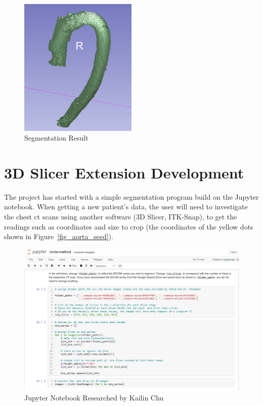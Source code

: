 \begin{figure}[H]
    \centering
    \includegraphics[width=0.5\textwidth]{figures/AGR/segmentation_result.png}
    \caption[Segmentation Result]{Segmentation Result}
    \label{fig_sr}
\end{figure}

\section{3D Slicer Extension Development}
The project has started with a simple segmentation program build on the Jupyter notebook. When getting a new patient's data, the user will need to investigate the chest ct scans using another software (3D Slicer, ITK-Snap), to get the readings such as coordinates and size to crop (the coordinates of the yellow dots shown in Figure~\ref{fig_aorta_seed}).

\begin{figure}[H]
    \centering
    \includegraphics[width=\textwidth]{figures/AGR/jupyter_research.png}
    \caption[Jupyter Notebook Research]{Jupyter Notebook Researched by Kailin Chu}
    \label{fig_jnr}
\end{figure}

